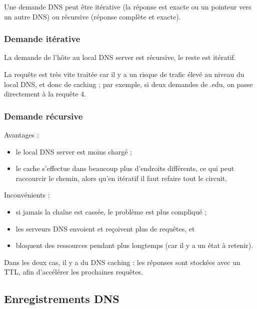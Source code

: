 	Une demande DNS peut être itérative (la réponse est exacte ou un pointeur vers un autre DNS) ou récursive (réponse complète et exacte).
	
		\subsubsection{Demande itérative}
		
		
		La demande de l'hôte au local DNS server est récursive, le reste est itératif.
		
		La requête est très vite traitée car il y a un risque de trafic élevé au niveau du local DNS, et donc de caching ; par exemple, si deux demandes de .edu, on passe directement à la requête 4.
	
		\subsubsection{Demande récursive}
		
		
		 Avantages :
		 
		 \begin{itemize}
			\item le local DNS server est moins chargé ;
			\item le cache s'effectue dans beaucoup plus d'endroits différents, ce qui peut raccourcir le chemin, alors qu'en itératif il faut refaire tout le circuit.
		 \end{itemize}
		 
		 Inconvénients : 
		 
		 \begin{itemize}
			\item si jamais la chaîne est cassée, le problème est plus compliqué ;
			\item les serveurs DNS envoient et reçoivent plus de requêtes, et
			\item bloquent des ressources pendant plus longtemps (car il y a un état à retenir).
		 \end{itemize}
		 
		 Dans les deux cas, il y a du DNS caching : les réponses sont stockées avec un TTL, afin d'accélérer les prochaines requêtes.
	
	\subsection{Enregistrements DNS}
	
